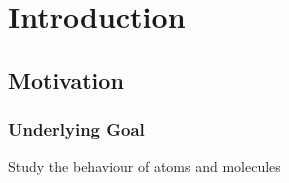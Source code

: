 \documentclass{beamer}
\begin{document}
\section{Introduction}

%	



\subsection{Motivation}

\begin{frame}
	\frametitle{Underlying Goal}
	
	\begin{center}
		\Large
		Study the behaviour of atoms and molecules
	\end{center}

\end{frame}



%
%
%
\end{document}

